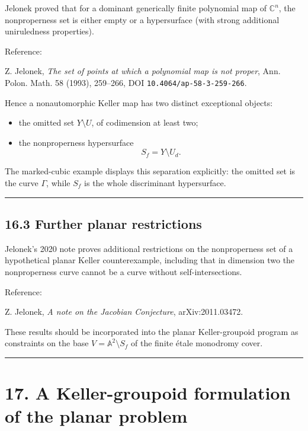 Jelonek proved that for a dominant generically finite polynomial map of
\(\mathbb C^n\), the nonproperness set is either empty or a hypersurface
(with strong additional uniruledness properties).

Reference:

Z. Jelonek, \emph{The set of points at which a polynomial map is not
proper}, Ann. Polon. Math. 58 (1993), 259--266, DOI
\texttt{10.4064/ap-58-3-259-266}.

Hence a nonautomorphic Keller map has two distinct exceptional objects:

\begin{itemize}
\tightlist
\item
  the omitted set \(Y\setminus U\), of codimension at least two;
\item
  the nonproperness hypersurface \[
  S_f=Y\setminus U_d.
  \]
\end{itemize}

The marked-cubic example displays this separation explicitly: the
omitted set is the curve \(\Gamma\), while \(S_f\) is the whole
discriminant hypersurface.

\begin{center}\rule{0.5\linewidth}{0.5pt}\end{center}

\subsection{16.3 Further planar
restrictions}\label{further-planar-restrictions}

Jelonek's 2020 note proves additional restrictions on the nonproperness
set of a hypothetical planar Keller counterexample, including that in
dimension two the nonproperness curve cannot be a curve without
self-intersections.

Reference:

Z. Jelonek, \emph{A note on the Jacobian Conjecture}, arXiv:2011.03472.

These results should be incorporated into the planar Keller-groupoid
program as constraints on the base \(V=\mathbb A^2\setminus S_f\) of the
finite étale monodromy cover.

\begin{center}\rule{0.5\linewidth}{0.5pt}\end{center}

\section{17. A Keller-groupoid formulation of the planar
problem}\label{a-keller-groupoid-formulation-of-the-planar-problem}

